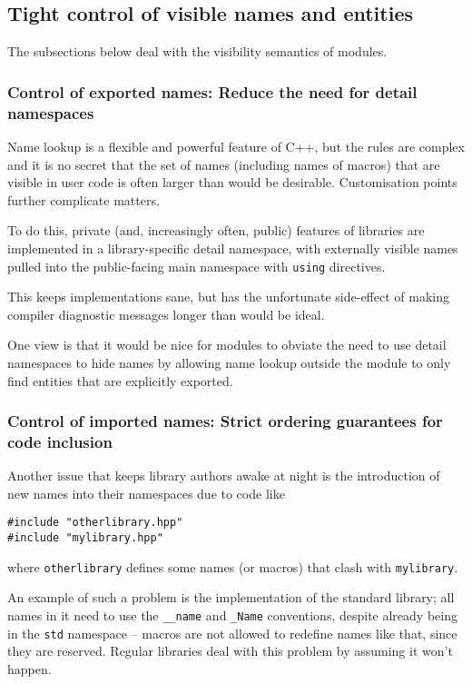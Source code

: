 \documentclass[reqno]{article}
\begin{document}
\subsection{Tight control of visible names and entities}

The subsections below deal with the visibility semantics of modules. 

\subsubsection{Control of exported names: Reduce the need for detail namespaces}

Name lookup is a flexible and powerful feature of C++, but the rules are
complex and it is no secret that the set of names (including names of macros)
that are visible in user code is often larger than would be desirable.
Customisation points further complicate matters.

To do this, private (and, increasingly often, public) features of libraries are
implemented in a library-specific detail namespace, with externally visible
names pulled into the public-facing main namespace with \texttt{using}
directives.

This keeps implementations sane, but has the unfortunate side-effect of making
compiler diagnostic messages longer than would be ideal.

One view is that it would be nice for modules to obviate the need to use detail
namespaces to hide names by allowing name lookup outside the module to only
find entities that are explicitly exported.


\subsubsection{Control of imported names: Strict ordering guarantees for code
inclusion}

Another issue that keeps library authors awake at night is the introduction of
new names into their namespaces due to code like

\begin{verbatim}
#include "otherlibrary.hpp"
#include "mylibrary.hpp"
\end{verbatim}

where \texttt{otherlibrary} defines some names (or macros) that clash with
\texttt{mylibrary}.

An example of such a problem is the implementation of the standard library; all
names in it need to use the \texttt{\_\_name} and \texttt{\_Name} conventions,
despite already being in the \texttt{std} namespace -- macros are not allowed
to redefine names like that, since they are reserved. Regular libraries deal
with this problem by assuming it won't happen.
\end{document}
